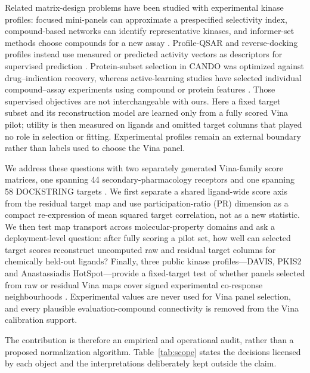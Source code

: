 \documentclass[11pt]{article}
\begin{document}
Related matrix-design problems have been studied with experimental kinase
profiles: focused mini-panels can approximate a prespecified selectivity index,
compound-based networks can identify representative kinases, and informer-set
methods choose compounds for a new assay \cite{bembenek2018,zhang2019informer,
laufkotter2020}. Profile-QSAR and reverse-docking profiles instead use measured
or predicted activity vectors as descriptors for supervised prediction
\cite{martin2011pqsar,lee2012profiles}. Protein-subset selection in CANDO was
optimized against drug--indication recovery, whereas active-learning studies
have selected individual compound--assay experiments using compound or protein
features \cite{mangione2019cando,kangas2014active}. Those supervised objectives
are not interchangeable with ours. Here a fixed target subset and its
reconstruction model are learned only from a fully scored Vina pilot; utility is
then measured on ligands and omitted target columns that played no role in
selection or fitting. Experimental profiles remain an external boundary rather
than labels used to choose the Vina panel.

We address these questions with two separately generated Vina-family score
matrices, one spanning 44 secondary-pharmacology receptors and one spanning 58
DOCKSTRING targets \cite{nikitin2025,dockstring2022}. We first separate a shared
ligand-wide score axis from the residual target map and use participation-ratio
(PR) dimension as a compact re-expression of mean squared target correlation,
not as a new statistic. We then test map transport across molecular-property
domains and ask a deployment-level question: after fully scoring a pilot set,
how well can selected target scores reconstruct uncomputed raw and residual
target columns for chemically held-out ligands? Finally, three public kinase
profiles---DAVIS, PKIS2 and Anastassiadis HotSpot---provide a fixed-target test
of whether panels selected from raw or residual Vina maps cover signed
experimental co-response neighbourhoods \cite{davis2011,wu2025davis,drewry2017,
anastassiadis2011}. Experimental values are never used for Vina panel selection,
and every plausible evaluation-compound connectivity is removed from the Vina
calibration support.

The contribution is therefore an empirical and operational audit, rather than
a proposed normalization algorithm. Table~\ref{tab:scope} states the decisions
licensed by each object and the interpretations deliberately kept outside the
claim.
\end{document}
